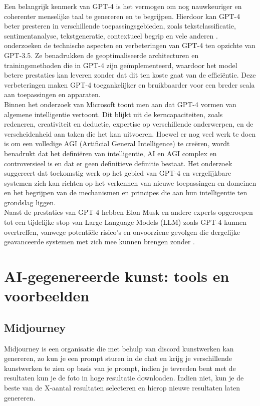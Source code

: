 Een belangrijk kenmerk van GPT-4 is het vermogen om nog nauwkeuriger en coherenter menselijke taal te genereren en te begrijpen. Hierdoor kan GPT-4 beter presteren in verschillende toepassingsgebieden, zoals tekstclassificatie, sentimentanalyse, tekstgeneratie, contextueel begrip en vele anderen \autocite{gpt_micai}. \\

\autocite{gpt_cn} onderzoeken de technische aspecten en verbeteringen van GPT-4 ten opzichte van GPT-3.5. Ze benadrukken de geoptimaliseerde architecturen en trainingsmethoden die in GPT-4 zijn geïmplementeerd, waardoor het model betere prestaties kan leveren zonder dat dit ten koste gaat van de efficiëntie. Deze verbeteringen maken GPT-4 toegankelijker en bruikbaarder voor een breder scala aan toepassingen en apparaten. \\

Binnen het onderzoek van Microsoft \autocite{gpt_micai} toont men aan dat GPT-4 vormen van algemene intelligentie vertoont. Dit blijkt uit de kerncapaciteiten, zoals redeneren, creativiteit en deductie, expertise op verschillende onderwerpen, en de verscheidenheid aan taken die het kan uitvoeren. Hoewel er nog veel werk te doen is om een volledige AGI (Artificial General Intelligence) te creëren, wordt benadrukt dat het definiëren van intelligentie, AI en AGI complex en controversieel is en dat er geen definitieve definitie bestaat. Het onderzoek suggereert dat toekomstig werk op het gebied van GPT-4 en vergelijkbare systemen zich kan richten op het verkennen van nieuwe toepassingen en domeinen en het begrijpen van de mechanismen en principes die aan hun intelligentie ten grondslag liggen. \\

Naast de prestaties van GPT-4 hebben Elon Musk en andere experts opgeroepen tot een tijdelijke stop van Large Language Models (LLM) zoals GPT-4 kunnen overtreffen, vanwege potentiële risico's en onvoorziene gevolgen die dergelijke geavanceerde systemen met zich mee kunnen brengen zonder \autocite{reuters_musk}. 
 
\section{AI-gegenereerde kunst: tools en voorbeelden}
\subsection{ Midjourney}
Midjourney is een organisatie die met behulp van discord kunstwerken kan genereren, zo kun je een prompt sturen in de chat en krijg je verschillende kunstwerken te zien op basis van je prompt, indien je tevreden bent met de resultaten kun je de foto in hoge resultatie downloaden. Indien niet, kun je de beste van de X-aantal resultaten selecteren en hierop nieuwe resultaten laten genereren. 

